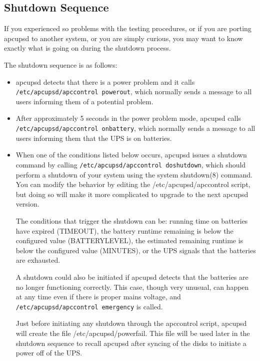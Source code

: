 {{{{{{{{\label{index-Shutdown-Sequence-259}

\label{Shutdown-Sequence-_003c1_003e}

\subsection*{Shutdown Sequence}

If you experienced so problems with the testing procedures, or if you are
porting apcupsd to another system, or you are simply curious, you may want to
know exactly what is going on during the shutdown process.  

The shutdown sequence is as follows:  

\begin{itemize}
\item apcupsd detects that there is a power problem and it calls {\tt
   /etc/apcupsd/apccontrol powerout}, which normally sends a message to all users
   informing them of a potential problem.  
\item After approximately 5 seconds in the power problem mode, apcupsd calls
   {\tt /etc/apcupsd/apccontrol onbattery}, which normally sends a message to all
   users informing them that the UPS is on batteries.  
\item When one of the conditions listed below occurs, apcupsd issues a
   shutdown command by calling {\tt /etc/apcupsd/apccontrol doshutdown},
   which should perform a shutdown of your system using the system
   shutdown(8) command.  You can modify the behavior by editing the
   /etc/apcupsd/apccontrol script, but doing so will make it more
   complicated to upgrade to the next apcupsd version.
 

The conditions that trigger the shutdown can be: running time on batteries
have expired (TIMEOUT), the battery runtime remaining is below the configured
value (BATTERYLEVEL), the estimated remaining runtime is below the configured
value (MINUTES), or the UPS signals that the batteries are exhausted.  

A shutdown could also be initiated if apcupsd detects that the batteries are
no longer functioning correctly. This case, though very unusual, can happen at
any time even if there is proper mains voltage, and {\tt
/etc/apcupsd/apccontrol emergency} is called.  

Just before initiating any shutdown through the apccontrol script, apcupsd
will create the file /etc/apcupsd/powerfail. This file will be used later in
the shutdown sequence to recall apcupsd after syncing of the disks to initiate
a power off of the UPS.  


\end{itemize}}}}}}}}}
